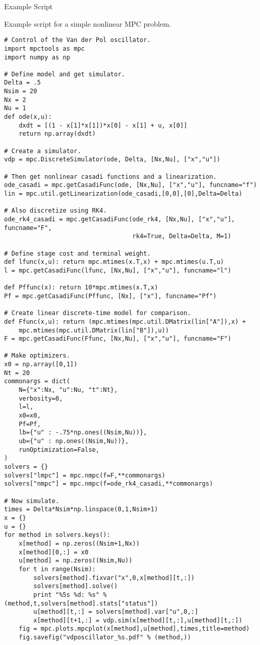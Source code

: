 \documentclass[xcolor=dvipsnames]{beamer}
\begin{document}
\begin{frame}{Example Script}

Example script for a simple nonlinear MPC problem.

\begin{lstlisting}[style=python,basicstyle=\ttfamily\fontsize{6pt}{8}\selectfont]
# Control of the Van der Pol oscillator.
import mpctools as mpc
import numpy as np

# Define model and get simulator.
Delta = .5
Nsim = 20
Nx = 2
Nu = 1
def ode(x,u):
    dxdt = [(1 - x[1]*x[1])*x[0] - x[1] + u, x[0]]
    return np.array(dxdt)

# Create a simulator.
vdp = mpc.DiscreteSimulator(ode, Delta, [Nx,Nu], ["x","u"])

# Then get nonlinear casadi functions and a linearization.
ode_casadi = mpc.getCasadiFunc(ode, [Nx,Nu], ["x","u"], funcname="f")
lin = mpc.util.getLinearization(ode_casadi,[0,0],[0],Delta=Delta)

# Also discretize using RK4.
ode_rk4_casadi = mpc.getCasadiFunc(ode_rk4, [Nx,Nu], ["x","u"], funcname="F",
                                   rk4=True, Delta=Delta, M=1)

# Define stage cost and terminal weight.
def lfunc(x,u): return mpc.mtimes(x.T,x) + mpc.mtimes(u.T,u)
l = mpc.getCasadiFunc(lfunc, [Nx,Nu], ["x","u"], funcname="l")

def Pffunc(x): return 10*mpc.mtimes(x.T,x)
Pf = mpc.getCasadiFunc(Pffunc, [Nx], ["x"], funcname="Pf")

# Create linear discrete-time model for comparison.
def Ffunc(x,u): return (mpc.mtimes(mpc.util.DMatrix(lin["A"]),x) +
    mpc.mtimes(mpc.util.DMatrix(lin["B"]),u))
F = mpc.getCasadiFunc(Ffunc, [Nx,Nu], ["x","u"], funcname="F")

# Make optimizers.
x0 = np.array([0,1])
Nt = 20
commonargs = dict(
    N={"x":Nx, "u":Nu, "t":Nt},
    verbosity=0,
    l=l,
    x0=x0,
    Pf=Pf,
    lb={"u" : -.75*np.ones((Nsim,Nu))},
    ub={"u" : np.ones((Nsim,Nu))},
    runOptimization=False,
)
solvers = {}
solvers["lmpc"] = mpc.nmpc(f=F,**commonargs)
solvers["nmpc"] = mpc.nmpc(f=ode_rk4_casadi,**commonargs)

# Now simulate.
times = Delta*Nsim*np.linspace(0,1,Nsim+1)
x = {}
u = {}
for method in solvers.keys():
    x[method] = np.zeros((Nsim+1,Nx))
    x[method][0,:] = x0
    u[method] = np.zeros((Nsim,Nu))
    for t in range(Nsim):
        solvers[method].fixvar("x",0,x[method][t,:])
        solvers[method].solve()
        print "%5s %d: %s" % (method,t,solvers[method].stats["status"])
        u[method][t,:] = solvers[method].var["u",0,:]
        x[method][t+1,:] = vdp.sim(x[method][t,:],u[method][t,:])
    fig = mpc.plots.mpcplot(x[method],u[method],times,title=method)
    fig.savefig("vdposcillator_%s.pdf" % (method,))
\end{lstlisting}

\end{frame}
\end{document}
